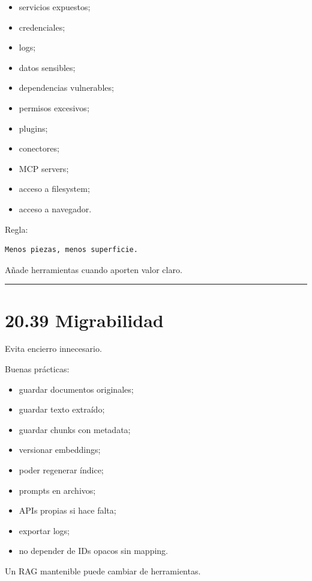 \begin{itemize}
\tightlist
\item
  servicios expuestos;
\item
  credenciales;
\item
  logs;
\item
  datos sensibles;
\item
  dependencias vulnerables;
\item
  permisos excesivos;
\item
  plugins;
\item
  conectores;
\item
  MCP servers;
\item
  acceso a filesystem;
\item
  acceso a navegador.
\end{itemize}

Regla:

\begin{lstlisting}
Menos piezas, menos superficie.
\end{lstlisting}

Añade herramientas cuando aporten valor claro.

\begin{center}\rule{0.5\linewidth}{0.5pt}\end{center}

\section{20.39 Migrabilidad}\label{migrabilidad}

Evita encierro innecesario.

Buenas prácticas:

\begin{itemize}
\tightlist
\item
  guardar documentos originales;
\item
  guardar texto extraído;
\item
  guardar chunks con metadata;
\item
  versionar embeddings;
\item
  poder regenerar índice;
\item
  prompts en archivos;
\item
  APIs propias si hace falta;
\item
  exportar logs;
\item
  no depender de IDs opacos sin mapping.
\end{itemize}

Un RAG mantenible puede cambiar de herramientas.

